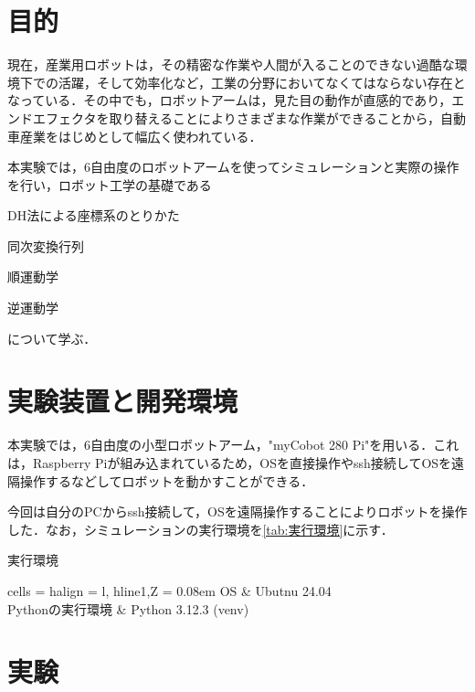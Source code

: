 \documentclass{ltjsarticle}
\begin{document}


\setcounter{page}{1}

\section{目的}
現在，産業用ロボットは，その精密な作業や人間が入ることのできない過酷な環境下での活躍，そして効率化など，工業の分野においてなくてはならない存在となっている．その中でも，ロボットアームは，見た目の動作が直感的であり，エンドエフェクタを取り替えることによりさまざまな作業ができることから，自動車産業をはじめとして幅広く使われている．

本実験では，6自由度のロボットアームを使ってシミュレーションと実際の操作を行い，ロボット工学の基礎である
\begin{enumerate*}
	\item DH法による座標系のとりかた
	\item 同次変換行列
	\item 順運動学
	\item 逆運動学
\end{enumerate*}
について学ぶ．

\section{実験装置と開発環境}
本実験では，6自由度の小型ロボットアーム，"myCobot 280 Pi"を用いる．これは，Raspberry Piが組み込まれているため，OSを直接操作やssh接続してOSを遠隔操作するなどしてロボットを動かすことができる．

今回は自分のPCからssh接続して，OSを遠隔操作することによりロボットを操作した．なお，シミュレーションの実行環境を\cref{tab:実行環境}に示す．
\begin{table}[H]
	\centering
	\caption{実行環境}
	\label{tab:実行環境}
	\begin{tblr}{
		cells = {halign = l},
		hline{1,Z} = {0.08em}
	}
		OS & Ubutnu 24.04 \\
		Pythonの実行環境 & Python 3.12.3 (venv)
	\end{tblr}
\end{table}

\section{実験}
\end{document}
